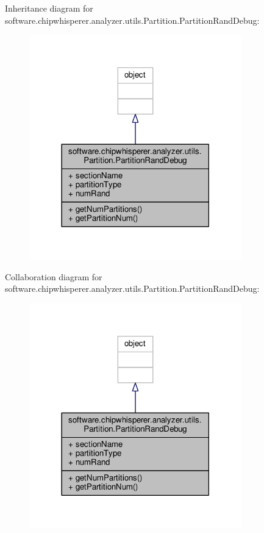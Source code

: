 Inheritance diagram for software.\+chipwhisperer.\+analyzer.\+utils.\+Partition.\+Partition\+Rand\+Debug\+:\nopagebreak
\begin{figure}[H]
\begin{center}
\leavevmode
\includegraphics[width=261pt]{dd/d20/classsoftware_1_1chipwhisperer_1_1analyzer_1_1utils_1_1Partition_1_1PartitionRandDebug__inherit__graph}
\end{center}
\end{figure}


Collaboration diagram for software.\+chipwhisperer.\+analyzer.\+utils.\+Partition.\+Partition\+Rand\+Debug\+:\nopagebreak
\begin{figure}[H]
\begin{center}
\leavevmode
\includegraphics[width=261pt]{d5/dee/classsoftware_1_1chipwhisperer_1_1analyzer_1_1utils_1_1Partition_1_1PartitionRandDebug__coll__graph}
\end{center}
\end{figure}


